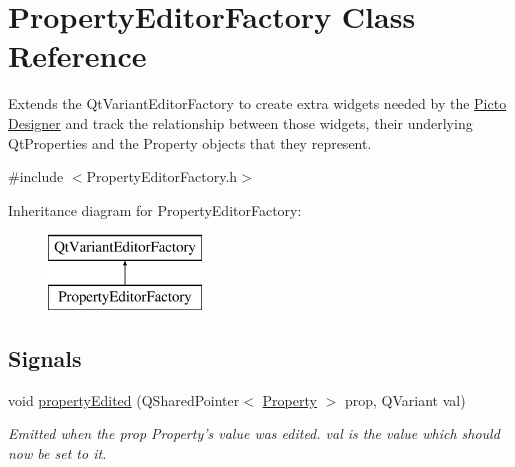 \hypertarget{class_property_editor_factory}{\section{Property\-Editor\-Factory Class Reference}
\label{class_property_editor_factory}
}


Extends the Qt\-Variant\-Editor\-Factory to create extra widgets needed by the \hyperlink{namespace_picto}{Picto} \hyperlink{class_designer}{Designer} and track the relationship between those widgets, their underlying Qt\-Properties and the Property objects that they represent.  




{\ttfamily \#include $<$Property\-Editor\-Factory.\-h$>$}

Inheritance diagram for Property\-Editor\-Factory\-:\begin{figure}[H]
\begin{center}
\leavevmode
\includegraphics[height=2.000000cm]{class_property_editor_factory}
\end{center}
\end{figure}
\subsection*{Signals}
\begin{DoxyCompactItemize}
\item 
void \hyperlink{class_property_editor_factory_af08e17ed7bfc43dee7cbce5ed9e00e7f}{property\-Edited} (Q\-Shared\-Pointer$<$ \hyperlink{class_picto_1_1_property}{Property} $>$ prop, Q\-Variant val)
\begin{DoxyCompactList}\small\item\em Emitted when the prop Property's value was edited. val is the value which should now be set to it. \end{DoxyCompactList}\end{DoxyCompactItemize}
